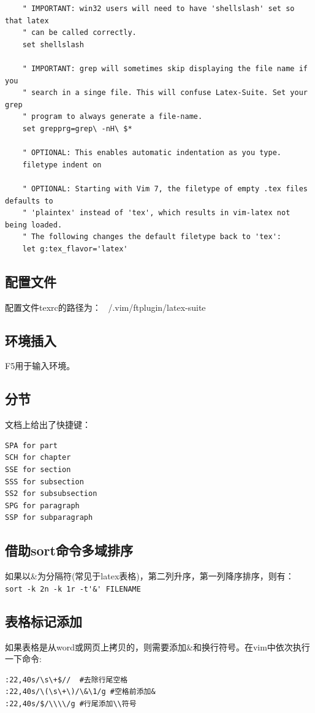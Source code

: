 {\begin{verbatim}
    " IMPORTANT: win32 users will need to have 'shellslash' set so that latex
    " can be called correctly.
    set shellslash
    
    " IMPORTANT: grep will sometimes skip displaying the file name if you
    " search in a singe file. This will confuse Latex-Suite. Set your grep
    " program to always generate a file-name.
    set grepprg=grep\ -nH\ $*
    
    " OPTIONAL: This enables automatic indentation as you type.
    filetype indent on
    
    " OPTIONAL: Starting with Vim 7, the filetype of empty .tex files defaults to
    " 'plaintex' instead of 'tex', which results in vim-latex not being loaded.
    " The following changes the default filetype back to 'tex':
    let g:tex_flavor='latex'

\end{verbatim}

\subsection{配置文件}
配置文件texrc的路径为：
~/.vim/ftplugin/latex-suite
\subsection{环境插入}
F5用于输入环境。

\subsection{分节}
文档上给出了快捷键：
\begin{verbatim}
SPA for part
SCH for chapter
SSE for section
SSS for subsection
SS2 for subsubsection
SPG for paragraph
SSP for subparagraph
\end{verbatim}


\subsection{借助sort命令多域排序}
如果以\&为分隔符(常见于latex表格)，第二列升序，第一列降序排序，则有：
\verb+sort -k 2n -k 1r -t'&' FILENAME+

\subsection{表格标记添加}
如果表格是从word或网页上拷贝的，则需要添加\&和换行符号。在vim中依次执行一下命令:
\begin{verbatim}
:22,40s/\s\+$//  #去除行尾空格
:22,40s/\(\s\+\)/\&\1/g #空格前添加&
:22,40s/$/\\\\/g #行尾添加\\符号
\end{verbatim}



}
